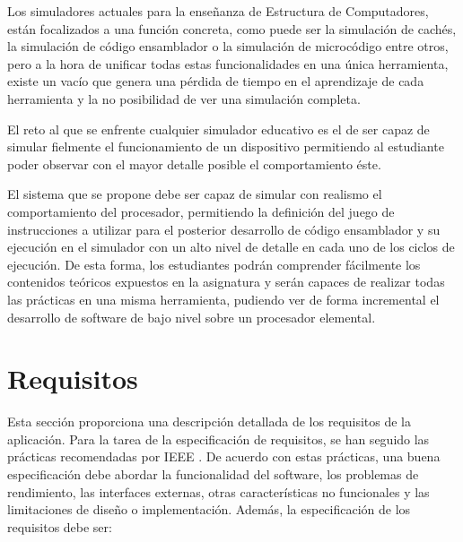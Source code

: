 Los simuladores actuales para la enseñanza de Estructura de Computadores, están focalizados a una función concreta, como puede ser la simulación de cachés, la simulación de código ensamblador o la simulación de microcódigo entre otros, pero a la hora de unificar todas estas funcionalidades en una única herramienta, existe un vacío que genera una pérdida de tiempo en el aprendizaje de cada herramienta y la no posibilidad de ver una simulación completa.

El reto al que se enfrente cualquier simulador educativo es el de ser capaz de simular fielmente el funcionamiento de un dispositivo permitiendo al estudiante poder observar con el mayor detalle posible el comportamiento éste.

El sistema que se propone debe ser capaz de simular con realismo el comportamiento del procesador, permitiendo la definición del juego de instrucciones a utilizar para el posterior desarrollo de código ensamblador y su ejecución en el simulador con un alto nivel de detalle en cada uno de los ciclos de ejecución. De esta forma, los estudiantes podrán comprender fácilmente los contenidos teóricos expuestos en la asignatura y serán capaces de realizar todas las prácticas en una misma herramienta, pudiendo ver de forma incremental el desarrollo de software de bajo nivel sobre un procesador elemental.


\section{Requisitos}
\label{sec:requirements}

Esta sección proporciona una descripción detallada de los requisitos de la aplicación. Para la tarea de la especificación de requisitos, se han seguido las prácticas recomendadas por IEEE \cite{ieee1998}. De acuerdo con estas prácticas, una buena especificación debe abordar la funcionalidad del software, los problemas de rendimiento, las interfaces externas, otras características no funcionales y las limitaciones de diseño o implementación.
Además, la especificación de los requisitos debe ser:

